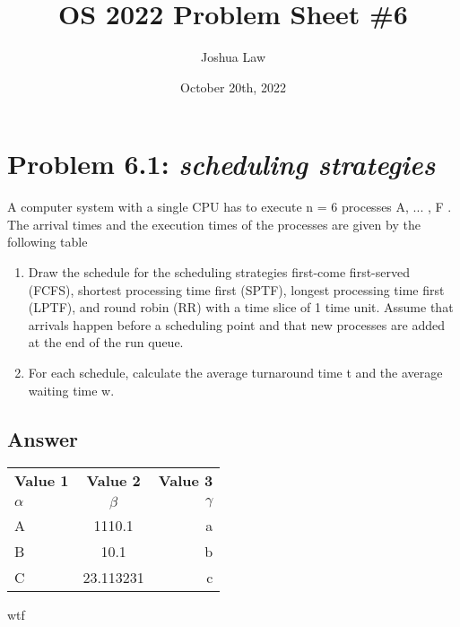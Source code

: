 \documentclass[
	12pt, %
]{fphw}
\title{OS 2022 Problem Sheet \#6} %
\author{Joshua Law} %
\date{October 20th, 2022} %
\institute{Jacobs University Bremen \\ Bachelor Of Computer Science} %
\begin{document}
\maketitle %


\section*{Problem 6.1: \emph{scheduling strategies}}

\begin{problem}
A computer system with a single CPU has to execute n = 6 processes A, ... , F . The arrival times and the execution times of the processes are given by the following table
\begin{enumerate}

\item Draw the schedule for the scheduling strategies first-come first-served (FCFS), shortest processing time first (SPTF), longest processing time first (LPTF), and round robin (RR) with a time slice of 1 time unit. Assume that arrivals happen before a scheduling point and that new processes are added at the end of the run queue.
\item For each schedule, calculate the average turnaround time t and the average waiting time w.\end{enumerate}
\end{problem}

\subsection*{Answer}\begin{table}

    \begin{tabular}{l|c|r} %
        \textbf{Value 1} & \textbf{Value 2} & \textbf{Value 3}\\
        $\alpha$ & $\beta$ & $\gamma$ \\
        \hline
        A & 1110.1 & a\\
        B & 10.1 & b\\
        C & 23.113231 & c\\
    \end{tabular}
wtf
\end{table}



\end{document}
